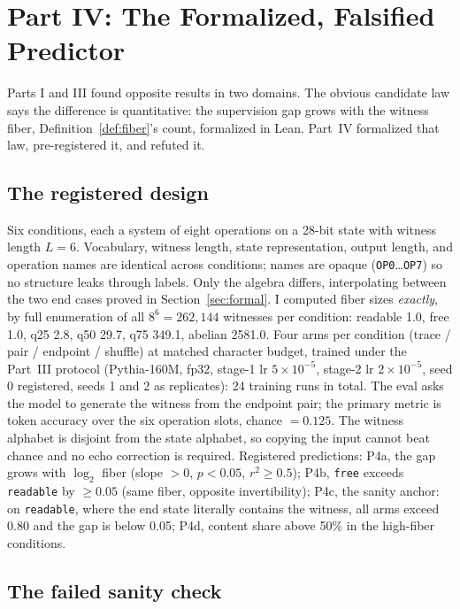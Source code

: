 \section{Part IV: The Formalized, Falsified Predictor}\label{sec:part4}

Parts I and III found opposite results in two domains. The obvious candidate law says the difference is quantitative: the supervision gap grows with the witness fiber, Definition~\ref{def:fiber}'s count, formalized in Lean. Part~IV formalized that law, pre-registered it, and refuted it.

\subsection{The registered design}

Six conditions, each a system of eight operations on a 28-bit state with witness length $L = 6$. Vocabulary, witness length, state representation, output length, and operation names are identical across conditions; names are opaque (\texttt{OP0}\dots\texttt{OP7}) so no structure leaks through labels. Only the algebra differs, interpolating between the two end cases proved in Section~\ref{sec:formal}. I computed fiber sizes \emph{exactly}, by full enumeration of all $8^6 = 262{,}144$ witnesses per condition: readable 1.0, free 1.0, q25 2.8, q50 29.7, q75 349.1, abelian 2581.0. Four arms per condition (trace / pair / endpoint / shuffle) at matched character budget, trained under the Part~III protocol (Pythia-160M, fp32, stage-1 lr $5\times10^{-5}$, stage-2 lr $2\times10^{-5}$, seed 0 registered, seeds 1 and 2 as replicates): 24 training runs in total. The eval asks the model to generate the witness from the endpoint pair; the primary metric is token accuracy over the six operation slots, chance $= 0.125$. The witness alphabet is disjoint from the state alphabet, so copying the input cannot beat chance and no echo correction is required. Registered predictions: P4a, the gap grows with $\log_2$ fiber (slope $>0$, $p<0.05$, $r^2 \geq 0.5$); P4b, \texttt{free} exceeds \texttt{readable} by $\geq 0.05$ (same fiber, opposite invertibility); P4c, the sanity anchor: on \texttt{readable}, where the end state literally contains the witness, all arms exceed 0.80 and the gap is below 0.05; P4d, content share above 50\% in the high-fiber conditions.

\subsection{The failed sanity check}

